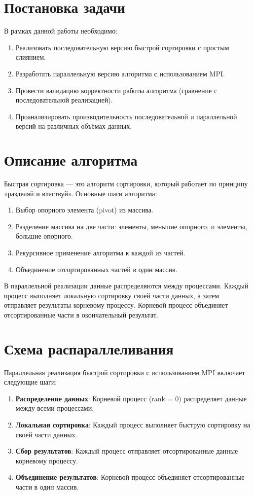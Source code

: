 \documentclass[a4paper,12pt]{article}
\begin{document}
\section{Постановка задачи}
В рамках данной работы необходимо:
\begin{enumerate}
    \item Реализовать последовательную версию быстрой сортировки с простым слиянием.
    \item Разработать параллельную версию алгоритма с использованием MPI.
    \item Провести валидацию корректности работы алгоритма (сравнение с последовательной реализацией).
    \item Проанализировать производительность последовательной и параллельной версий на различных объёмах данных.
\end{enumerate}

\section{Описание алгоритма}
Быстрая сортировка — это алгоритм сортировки, который работает по принципу «разделяй и властвуй». Основные шаги алгоритма:
\begin{enumerate}
    \item Выбор опорного элемента (pivot) из массива.
    \item Разделение массива на две части: элементы, меньшие опорного, и элементы, большие опорного.
    \item Рекурсивное применение алгоритма к каждой из частей.
    \item Объединение отсортированных частей в один массив.
\end{enumerate}

В параллельной реализации данные распределяются между процессами. Каждый процесс выполняет локальную сортировку своей части данных, а затем отправляет результаты корневому процессу. Корневой процесс объединяет отсортированные части в окончательный результат.

\section{Схема распараллеливания}
Параллельная реализация быстрой сортировки с использованием MPI включает следующие шаги:
\begin{enumerate}
    \item \textbf{Распределение данных}: Корневой процесс (rank = 0) распределяет данные между всеми процессами.
    \item \textbf{Локальная сортировка}: Каждый процесс выполняет быструю сортировку на своей части данных.
    \item \textbf{Сбор результатов}: Каждый процесс отправляет отсортированные данные корневому процессу.
    \item \textbf{Объединение результатов}: Корневой процесс объединяет отсортированные части в один массив.
\end{enumerate}
\end{document}
